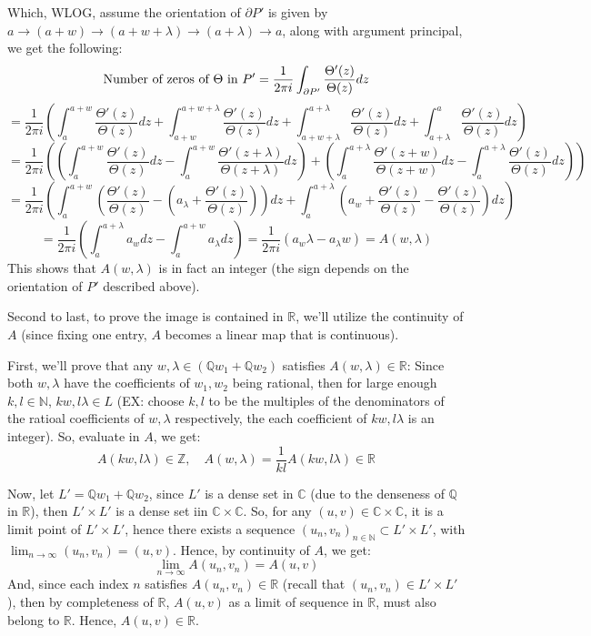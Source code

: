 \documentclass{article}
\begin{document}
\begin{itemize}
\begin{itemize}
        Which, WLOG, assume the orientation of $\partial P'$ is given by $a\rightarrow (a+w)\rightarrow (a+w+\lambda)\rightarrow (a+\lambda)\rightarrow a$, along with argument principal, we get the following:
        $$\textmd{Number of zeros of } \Theta \textmd{ in } P' = \frac{1}{2\pi i}\int_{\partial P'}\frac{\Theta'(z)}{\Theta(z)}dz$$
        $$ = \frac{1}{2\pi i}\left(\int_{a}^{a+w}\frac{\Theta'(z)}{\Theta(z)}dz+\int_{a+w}^{a+w+\lambda}\frac{\Theta'(z)}{\Theta(z)}dz+\int_{a+w+\lambda}^{a+\lambda}\frac{\Theta'(z)}{\Theta(z)}dz+\int_{a+\lambda}^{a}\frac{\Theta'(z)}{\Theta(z)}dz\right)$$
        $$=\frac{1}{2\pi i}\left(\left(\int_{a}^{a+w}\frac{\Theta'(z)}{\Theta(z)}dz - \int_{a}^{a+w}\frac{\Theta'(z+\lambda)}{\Theta(z+\lambda)}dz\right)+\left(\int_{a}^{a+\lambda}\frac{\Theta'(z+w)}{\Theta(z+w)}dz - \int_{a}^{a+\lambda}\frac{\Theta'(z)}{\Theta(z)}dz\right)\right)$$
        $$=\frac{1}{2\pi i}\left(\int_{a}^{a+w}\left(\frac{\Theta'(z)}{\Theta(z)}-\left(a_\lambda+\frac{\Theta'(z)}{\Theta(z)}\right)\right)dz + \int_{a}^{a+\lambda}\left(a_w+\frac{\Theta'(z)}{\Theta(z)}-\frac{\Theta'(z)}{\Theta(z)}\right)dz\right)$$
        $$ = \frac{1}{2\pi i}\left(\int_{a}^{a+\lambda}a_wdz - \int_{a}^{a+w}a_\lambda dz\right) = \frac{1}{2\pi i}(a_w\lambda - a_\lambda w) = A(w,\lambda)$$
        This shows that $A(w,\lambda)$ is in fact an integer (the sign depends on the orientation of $P'$ described above).
    \end{itemize}

    Second to last, to prove the image is contained in $\mathbb{R}$, we'll utilize the continuity of $A$ (since fixing one entry, $A$ becomes a linear map that is continuous). 

    First, we'll prove that any $w,\lambda\in(\mathbb{Q}w_1+\mathbb{Q}w_2)$ satisfies $A(w,\lambda) \in\mathbb{R}$: Since both $w,\lambda$ have the coefficients of $w_1,w_2$ being rational, then for large enough $k,l\in\mathbb{N}$, $kw,l\lambda\in L$ (EX: choose $k,l$ to be the multiples of the denominators of the ratioal coefficients of $w,\lambda$ respectively, the each coefficient of $kw,l\lambda$ is an integer).
    So, evaluate in $A$, we get:
    $$A(kw,l\lambda)\in\mathbb{Z},\quad A(w,\lambda) = \frac{1}{kl}A(kw,l\lambda) \in\mathbb{R}$$
    
    Now, let $L' = \mathbb{Q}w_1+\mathbb{Q}w_2$, since $L'$ is a dense set in $\mathbb{C}$ (due to the denseness of $\mathbb{Q}$ in $\mathbb{R}$), then $L'\times L'$ is a dense set iin $\mathbb{C}\times \mathbb{C}$. So, for any $(u,v)\in\mathbb{C}\times \mathbb{C}$, it is a limit point of $L'\times L'$, hence there exists a sequence $(u_n,v_n)_{n\in\mathbb{N}}\subset L'\times L'$, with $\lim_{n\rightarrow\infty}(u_n,v_n) = (u,v)$. Hence, by continuity of $A$, we get:
    $$\lim_{n\rightarrow\infty}A(u_n,v_n) = A(u,v)$$
    And, since each index $n$ satisfies $A(u_n,v_n)\in \mathbb{R}$ (recall that $(u_n,v_n)\in L'\times L'$), then by completeness of $\mathbb{R}$, $A(u,v)$ as a limit of sequence in $\mathbb{R}$, must also belong to $\mathbb{R}$. Hence, $A(u,v)\in\mathbb{R}$.


\end{itemize}
\end{document}
